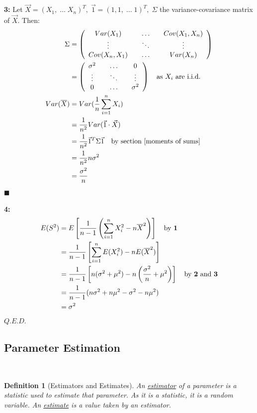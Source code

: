 \documentclass[12pt,a4paper]{article}
\newtheorem{defn}[thm]{Definition}
\begin{document}
\textbf{3:} Let $\vec{X} = (X_1,\; \hdots\; X_n)^T,\; \vec{1} = (1,1,\; \hdots\; 1)^T,\; \Sigma$ the variance-covariance matrix of $\vec{X}$. Then:
\begin{align*}
\Sigma &= \left(\begin{array}{ccc} Var(X_1)\quad& \hdots\quad& Cov(X_1,X_n)\\ \vdots\quad & \ddots\quad & \vdots\\ Cov(X_n,X_1)\quad& \hdots\quad& Var(X_n)\end{array}\right)\\
&= \left(\begin{array}{ccc} \sigma^2\quad& \hdots\quad& 0\\ \vdots\quad & \ddots\quad & \vdots\\ 0\quad &\hdots\quad &\sigma^2\end{array}\right)\quad\mbox{as $X_i$ are i.i.d.}\\
Var(\overline{X}) &= Var(\frac{1}{n}\sum_{i=1}^n X_i)\\
&= \frac{1}{n^2}Var(\vec{1} \cdot \vec{X})\\
&= \frac{1}{n^2} \vec{1}^T\Sigma\vec{1}\quad\mbox{by section \ref{moments of sums}}\\
&= \frac{1}{n^2}n\sigma^2\\
&= \frac{\sigma^2}{n}
\end{align*}\hfill$\blacksquare$

\textbf{4:}
\begin{align*}
E(S^2) &= E\left[\frac{1}{n-1}\left(\sum_{i=1}^n X_i^2 -n\overline{X}^2\right)\right]\quad\mbox{by \textbf{1}}\\
&= \frac{1}{n-1}\left[\sum_{i=1}^n E(X_i^2) - nE(\overline{X}^2)\right]\\
&= \frac{1}{n-1}\left[n(\sigma^2 + \mu^2) - n\left(\frac{\sigma^2}{n} + \mu^2\right)\right]\quad\mbox{by \textbf{2} and \textbf{3}}\\
&= \frac{1}{n-1}(n\sigma^2 + n\mu^2 - \sigma^2 -n\mu^2)\\
&= \sigma^2
\end{align*}\hfill$Q.E.D.$

\subsection{Parameter Estimation}$\;$

\begin{defn}[Estimators and Estimates]\vspace{1cm}

An \underline{estimator} of a parameter is a statistic used to estimate that parameter. As it is a statistic, it is a random variable. An \underline{estimate} is a value taken by an estimator.

\end{defn}
\end{document}
